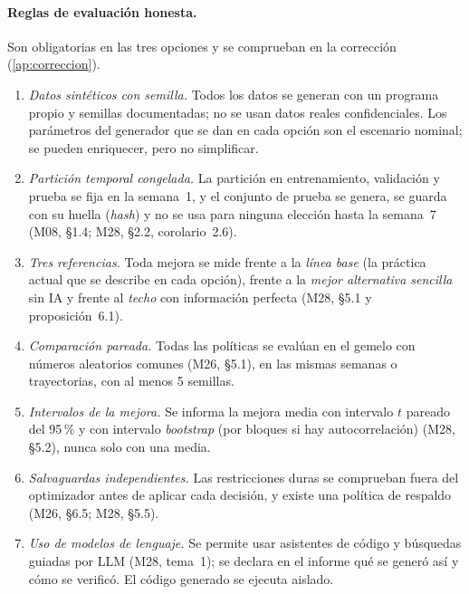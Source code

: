 \paragraph{Reglas de evaluación honesta.} Son obligatorias en las tres opciones y se comprueban en la corrección (\cref{ap:correccion}).
\begin{enumerate}[label=R\arabic*.]
  \item \emph{Datos sintéticos con semilla.} Todos los datos se generan con un programa propio y semillas documentadas; no se usan datos reales confidenciales. Los parámetros del generador que se dan en cada opción son el escenario nominal; se pueden enriquecer, pero no simplificar.
  \item \emph{Partición temporal congelada.} La partición en entrenamiento, validación y prueba se fija en la semana~1, y el conjunto de prueba se genera, se guarda con su huella (\emph{hash}) y no se usa para ninguna elección hasta la semana~7 (M08, §1.4; M28, §2.2, corolario~2.6).
  \item \emph{Tres referencias.} Toda mejora se mide frente a la \emph{línea base} (la práctica actual que se describe en cada opción), frente a la \emph{mejor alternativa sencilla} sin IA y frente al \emph{techo} con información perfecta (M28, §5.1 y proposición~6.1).
  \item \emph{Comparación pareada.} Todas las políticas se evalúan en el gemelo con números aleatorios comunes (M26, §5.1), en las mismas semanas o trayectorias, con al menos 5 semillas.
  \item \emph{Intervalos de la mejora.} Se informa la mejora media con intervalo $t$ pareado del 95\,\% y con intervalo \emph{bootstrap} (por bloques si hay autocorrelación) (M28, §5.2), nunca solo con una media.
  \item \emph{Salvaguardas independientes.} Las restricciones duras se comprueban fuera del optimizador antes de aplicar cada decisión, y existe una política de respaldo (M26, §6.5; M28, §5.5).
  \item \emph{Uso de modelos de lenguaje.} Se permite usar asistentes de código y búsquedas guiadas por LLM (M28, tema~1); se declara en el informe qué se generó así y cómo se verificó. El código generado se ejecuta aislado.
\end{enumerate}

